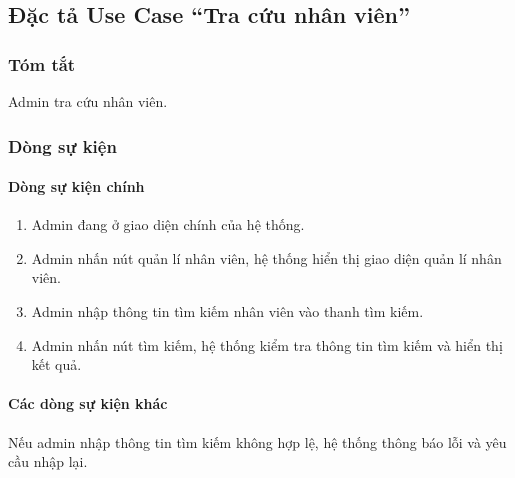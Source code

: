 \subsection{Đặc tả Use Case ``Tra cứu nhân viên''}

\subsubsection{Tóm tắt}
Admin tra cứu nhân viên.

\subsubsection{Dòng sự kiện}
\paragraph{\textbf{Dòng sự kiện chính}}
\begin{enumerate}
  \item Admin đang ở giao diện chính của hệ thống.
  \item Admin nhấn nút quản lí nhân viên, hệ thống hiển thị giao diện quản lí nhân viên.
  \item Admin nhập thông tin tìm kiếm nhân viên vào thanh tìm kiếm.
  \item Admin nhấn nút tìm kiếm, hệ thống kiểm tra thông tin tìm kiếm và hiển thị kết quả.
\end{enumerate}

\paragraph{\textbf{Các dòng sự kiện khác}}
Nếu admin nhập thông tin tìm kiếm không hợp lệ, hệ thống thông báo lỗi và yêu cầu nhập lại.

